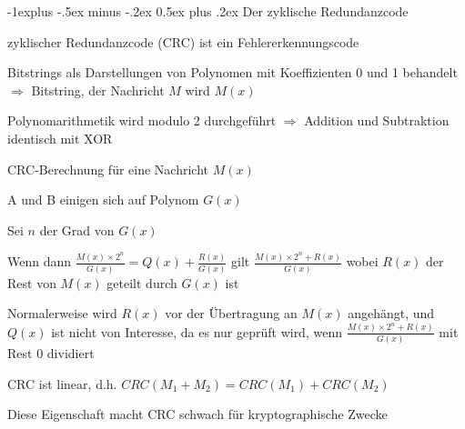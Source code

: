 \documentclass[a4paper]{article}
\makeatletter
\renewcommand{\subsection}{\@startsection{subsection}{2}{0mm}%
 {-1explus -.5ex minus -.2ex}%
 {0.5ex plus .2ex}%
 {\normalfont\normalsize\bfseries}}
\makeatother
\begin{document}
\begin{multicols}{3}
      \subsection{Der zyklische Redundanzcode}
      \begin{itemize*}
            \item zyklischer Redundanzcode (CRC) ist ein Fehlererkennungscode
            \item Bitstrings als Darstellungen von Polynomen mit Koeffizienten 0 und 1 behandelt $\Rightarrow$ Bitstring, der Nachricht $M$ wird $M(x)$
            \item Polynomarithmetik wird modulo 2 durchgeführt $\Rightarrow$ Addition und Subtraktion identisch mit XOR
            \item CRC-Berechnung für eine Nachricht $M(x)$
            \begin{itemize*}
                  \item A und B einigen sich auf Polynom $G(x)$%
                  \item Sei $n$ der Grad von $G(x)$%
                  \item Wenn dann $\frac{M(x)\times 2^n}{G(x)}=Q(x)+\frac{R(x)}{G(x)}$ gilt $\frac{M(x)\times 2^n +R(x)}{G(x)}$ wobei $R(x)$ der Rest von $M(x)$ geteilt durch $G(x)$ ist
                  \item Normalerweise wird $R(x)$ vor der Übertragung an $M(x)$ angehängt, und $Q(x)$ ist nicht von Interesse, da es nur geprüft wird, wenn $\frac{M(x)\times 2^n+R(x)}{G(x)}$ mit Rest $0$ dividiert
            \end{itemize*}
            \item CRC ist linear, d.h. $CRC(M_1 + M_2) = CRC(M_1) + CRC(M_2)$
            \item Diese Eigenschaft macht CRC schwach für kryptographische Zwecke
      \end{itemize*}


\end{multicols}
\end{document}
